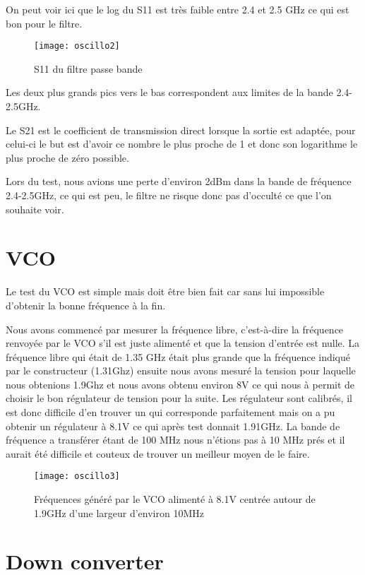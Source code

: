 On peut voir ici que le log du S11 est très faible entre 2.4 et 2.5 GHz ce qui est bon pour le filtre.

\begin{figure}[h]
  \centering
  \texttt{[image: oscillo2]}
  \caption{S11 du filtre passe bande}
  \label{fig:filtre}
\end{figure}


Les deux plus grands pics vers le bas correspondent aux limites de la bande 2.4-2.5GHz.

Le S21 est le coefficient de transmission direct lorsque la sortie est adaptée, pour celui-ci le but est d’avoir ce nombre le plus proche de 1 et donc son logarithme le plus proche de zéro possible.

Lors du test, nous avions une perte d’environ 2dBm dans la bande de fréquence 2.4-2.5GHz, ce qui est peu, le filtre ne risque donc pas d’occulté ce que l’on souhaite voir.
\newpage
\section{VCO}



Le test du VCO est simple mais doit être bien fait car sans lui impossible d’obtenir la bonne fréquence à la fin.

Nous avons commencé par mesurer la fréquence libre, c’est-à-dire la fréquence renvoyée par le VCO s’il est juste alimenté et que la tension d’entrée est nulle. La fréquence libre qui était de 1.35 GHz était plus grande que la fréquence indiqué par le constructeur (1.31Ghz) ensuite nous avons mesuré la tension pour laquelle nous obtenions 1.9Ghz et nous avons obtenu environ 8V ce qui nous à permit de choisir le bon régulateur de tension pour la suite. Les régulateur sont calibrés, il est donc difficile d’en trouver un qui corresponde parfaitement mais on a pu obtenir un régulateur à 8.1V ce qui après test donnait 1.91GHz. La bande de fréquence a transférer étant de 100 MHz nous n’étions pas à 10 MHz prés et il aurait été difficile et couteux de trouver un meilleur moyen de le faire.


\begin{figure}[h]
  \centering
  \texttt{[image: oscillo3]}
  \caption{Fréquences généré par le VCO alimenté à 8.1V centrée autour de 1.9GHz d’une largeur d’environ 10MHz}
  \label{fig:freq}
\end{figure}
\newpage
\section{Down converter}
\label{sec:down_converter}



